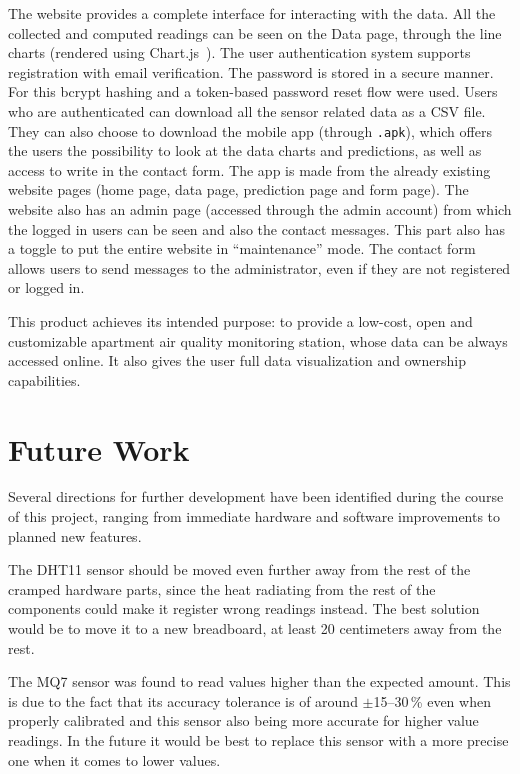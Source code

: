 The website provides a complete interface for interacting with the data. All the collected and
computed readings can be seen on the Data page, through the line charts (rendered using
Chart.js~\cite{chartjs}). The user authentication system supports registration with email
verification. The password is stored in a secure manner. For this bcrypt hashing and a
token-based password reset flow were used. Users who are authenticated can download all the
sensor related data as a CSV file. They can also choose to download the mobile app (through
\texttt{.apk}), which offers the users the possibility to look at the data charts and
predictions, as well as access to write in the contact form. The app is made from the already
existing website pages (home page, data page, prediction page and form page). The website also
has an admin page (accessed through the admin account) from which the logged in users can be
seen and also the contact messages. This part also has a toggle to put the entire website in
``maintenance'' mode. The contact form allows users to send messages to the administrator,
even if they are not registered or logged in.

This product achieves its intended purpose: to provide a low-cost, open and customizable
apartment air quality monitoring station, whose data can be always accessed online. It also
gives the user full data visualization and ownership capabilities.

\section{Future Work}
\label{sec:future-work}

Several directions for further development have been identified during the course of this
project, ranging from immediate hardware and software improvements to planned new features.

The DHT11 sensor should be moved even further away from the rest of the cramped hardware parts,
since the heat radiating from the rest of the components could make it register wrong readings
instead. The best solution would be to move it to a new breadboard, at least 20 centimeters
away from the rest.

The MQ7 sensor was found to read values higher than the expected amount. This is due to the
fact that its accuracy tolerance is of around $\pm$15--30\,\% even when properly calibrated and
this sensor also being more accurate for higher value readings. In the future it would be best
to replace this sensor with a more precise one when it comes to lower values.

